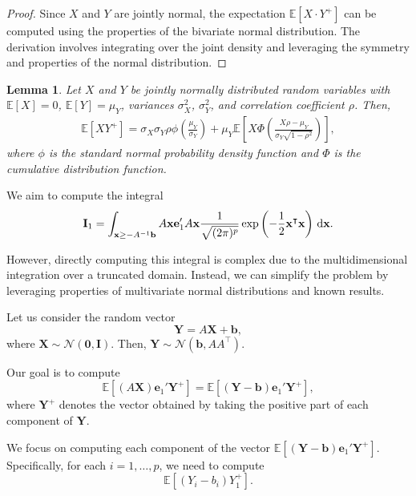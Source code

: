 \documentclass[10pt,a4paper,reqno]{amsart}
\newtheorem{lemma}[theorem]{Lemma}
\theoremstyle{example}
\newcommand*\D{\mathop{}\!\textnormal{d}}
\begin{document}
\begin{proof}
Since $X$ and $Y$ are jointly normal, the expectation $\mathbb{E}[ X \cdot Y^+ ]$ can be computed using the properties of the bivariate normal distribution. The derivation involves integrating over the joint density and leveraging the symmetry and properties of the normal distribution.
\end{proof}


\begin{lemma}
Let \(X\) and \(Y\) be jointly normally distributed random variables with \(\mathbb{E}[X] = 0\), \(\mathbb{E}[Y] = \mu_Y\), variances \(\sigma_X^2\), \(\sigma_Y^2\), and correlation coefficient \(\rho\). Then,
\begin{align*}
\mathbb{E}[ X Y^+ ] = \sigma_X \sigma_Y \rho \phi\left( \frac{\mu_Y}{\sigma_Y} \right) + \mu_Y \mathbb{E}[ X \Phi\left( \frac{X \rho - \mu_Y}{\sigma_Y \sqrt{1 - \rho^2}} \right) ],
\end{align*}
where \(\phi\) is the standard normal probability density function and \(\Phi\) is the cumulative distribution function.  
\end{lemma}

We aim to compute the integral
\begin{align*}
    \mathbf{I}_1 = \int_{\mathbf{x} \geq -A^{-1}\mathbf{b}} A \mathbf{x} \mathbf{e}_1' A \mathbf{x} \frac{1}{\sqrt{(2\pi)^p}} \exp\left( -\frac{1}{2} \mathbf{x}^\intercal \mathbf{x} \right) \, \D \mathbf{x}.
\end{align*}

However, directly computing this integral is complex due to the multidimensional integration over a truncated domain. Instead, we can simplify the problem by leveraging properties of multivariate normal distributions and known results.

Let us consider the random vector
\[
\mathbf{Y} = A \mathbf{X} + \mathbf{b},
\]
where \(\mathbf{X} \sim \mathcal{N}(\mathbf{0}, \mathbf{I})\). Then, \(\mathbf{Y} \sim \mathcal{N}(\mathbf{b}, AA^\intercal)\).

Our goal is to compute
\[
\mathbb{E}\left[ (A \mathbf{X}) \mathbf{e}_1' \mathbf{Y}^+ \right] = \mathbb{E}\left[ (\mathbf{Y} - \mathbf{b}) \mathbf{e}_1' \mathbf{Y}^+ \right],
\]
where \(\mathbf{Y}^+\) denotes the vector obtained by taking the positive part of each component of \(\mathbf{Y}\).

We focus on computing each component of the vector \(\mathbb{E}\left[ (\mathbf{Y} - \mathbf{b}) \mathbf{e}_1' \mathbf{Y}^+ \right]\). Specifically, for each \(i = 1, \dots, p\), we need to compute
\[
\mathbb{E}\left[ (Y_i - b_i) Y_1^+ \right].
\]
\end{document}
